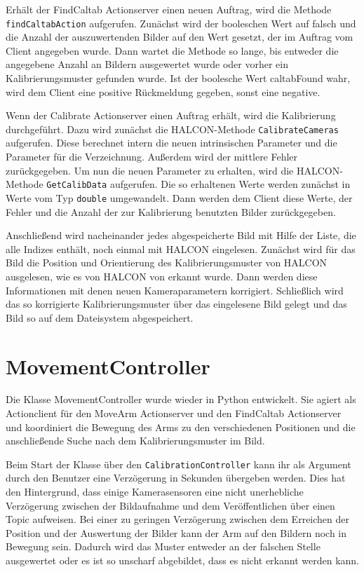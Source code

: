 Erhält der FindCaltab Actionserver einen neuen Auftrag, wird die Methode \texttt{findCaltabAction} aufgerufen. Zunächst wird der booleschen Wert auf falsch und die Anzahl der auszuwertenden Bilder auf den Wert gesetzt, der im Auftrag vom Client angegeben wurde. Dann wartet die Methode so lange, bis entweder die angegebene Anzahl an Bildern ausgewertet wurde oder vorher ein Kalibrierungsmuster gefunden wurde. Ist der boolesche Wert caltabFound wahr, wird dem Client eine positive Rückmeldung gegeben, sonst eine negative.

Wenn der Calibrate Actionserver einen Auftrag erhält, wird die Kalibrierung durchgeführt. Dazu wird zunächst die HALCON-Methode \texttt{CalibrateCameras} aufgerufen. Diese berechnet intern die neuen intrinsischen Parameter und die Parameter für die Verzeichnung. Außerdem wird der mittlere Fehler zurückgegeben. Um nun die neuen Parameter zu erhalten, wird die HALCON-Methode \texttt{GetCalibData} aufgerufen. Die so erhaltenen Werte werden zunächst in Werte vom Typ \texttt{double} umgewandelt. Dann werden dem Client diese Werte, der Fehler und die Anzahl der zur Kalibrierung benutzten Bilder zurückgegeben.

Anschließend wird nacheinander jedes abgespeicherte Bild mit Hilfe der Liste, die alle Indizes enthält, noch einmal mit HALCON eingelesen. Zunächst wird für das Bild die Position und Orientierung des Kalibrierungsmuster von HALCON ausgelesen, wie es von HALCON von erkannt wurde. Dann werden diese Informationen mit denen neuen Kameraparametern korrigiert. Schließlich wird das so korrigierte Kalibrierungsmuster über das eingelesene Bild gelegt und das Bild so auf dem Dateisystem abgespeichert.

\section{MovementController} %
\label{sec:movementcontroller_impl}
Die Klasse MovementController wurde wieder in Python entwickelt. Sie agiert als Actionclient für den MoveArm Actionserver und den FindCaltab Actionserver und koordiniert die Bewegung des Arms zu den verschiedenen Positionen und die anschließende Suche nach dem Kalibrierungsmuster im Bild.

Beim Start der Klasse über den \texttt{CalibrationController} kann ihr als Argument durch den Benutzer eine Verzögerung in Sekunden übergeben werden. Dies hat den Hintergrund, dass einige Kamerasensoren eine nicht unerhebliche Verzögerung zwischen der Bildaufnahme und dem Veröffentlichen über einen Topic aufweisen. Bei einer zu geringen Verzögerung zwischen dem Erreichen der Position und der Auswertung der Bilder kann der Arm auf den Bildern noch in Bewegung sein. Dadurch wird das Muster entweder an der falschen Stelle ausgewertet oder es ist so unscharf abgebildet, dass es nicht erkannt werden kann.

